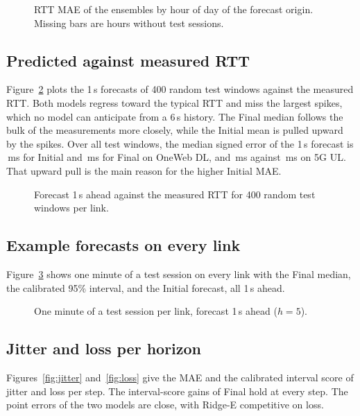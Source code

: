 \begin{figure}[h]
  \centering
  \resizebox{\linewidth}{!}{}
  \caption{RTT MAE of the ensembles by hour of day of the forecast origin. Missing bars are hours without test sessions.}
  \label{fig:hour}
\end{figure}

\subsection{Predicted against measured RTT}
Figure~\ref{fig:scatter} plots the 1\,s forecasts of 400 random test windows against the measured RTT. Both models regress toward the typical RTT and miss the largest spikes, which no model can anticipate from a 6\,s history. The Final median follows the bulk of the measurements more closely, while the Initial mean is pulled upward by the spikes. Over all test windows, the median signed error of the 1\,s forecast is \BiasYtwoOWDL\,ms for Initial and \BiasYthreeOWDL\,ms for Final on OneWeb DL, and \BiasYtwoQUL\,ms against \BiasYthreeQUL\,ms on 5G UL. That upward pull is the main reason for the higher Initial MAE.

\begin{figure}[h]
  \centering
  \resizebox{\linewidth}{!}{}
  \caption{Forecast 1\,s ahead against the measured RTT for 400 random test windows per link.}
  \label{fig:scatter}
\end{figure}

\subsection{Example forecasts on every link}
Figure~\ref{fig:traces} shows one minute of a test session on every link with the Final median, the calibrated 95\% interval, and the Initial forecast, all 1\,s ahead.

\begin{figure}[p]
  \centering
  \resizebox{\linewidth}{!}{}
  \caption{One minute of a test session per link, forecast 1\,s ahead ($h=5$).}
  \label{fig:traces}
\end{figure}

\subsection{Jitter and loss per horizon}
Figures~\ref{fig:jitter} and~\ref{fig:loss} give the MAE and the calibrated interval score of jitter and loss per step. The interval-score gains of Final hold at every step. The point errors of the two models are close, with Ridge-E competitive on loss.

